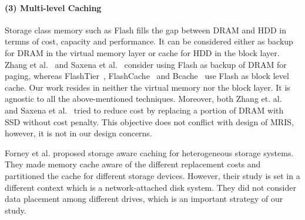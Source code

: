 \paragraph{(3) Multi-level Caching}
%
Storage class memory such as Flash fills the gap between DRAM and HDD
in termns of cost, capacity and performance. It can be considered
either as backup for DRAM in the virtual memory layer or cache for HDD
in the block layer. Zhang et al.~\cite{zhang2012multi} and Saxena et
al.~\cite{flashvm} consider using Flash as backup of DRAM for paging,
whereas FlashTier~\cite{eurosys_12_flashtier},
FlashCache~\cite{flashcache} and Bcache~\cite{bcache} use Flash as
block level cache. Our work resides in neither the virtual memory nor
the block layer. It is agnostic to all the above-mentioned techniques.
Moreover, both Zhang et. al.~\cite{zhang2012multi} and Saxena et
al.~\cite{flashvm} tried to reduce cost by replacing a portion of DRAM
with SSD without cost penalty. This objective does not conflict with
design of MRIS, however, it is not in our design concerns.

Forney et al. \cite{Forney2002fast} proposed storage aware caching for
heterogeneous storage systems. They made memory cache aware of the
different replacement costs and partitioned the cache for different
storage devices.  However, their study is set in a different context
which is a network-attached disk system.  They did not consider data
placement among different drives, which is an important strategy of
our study.






